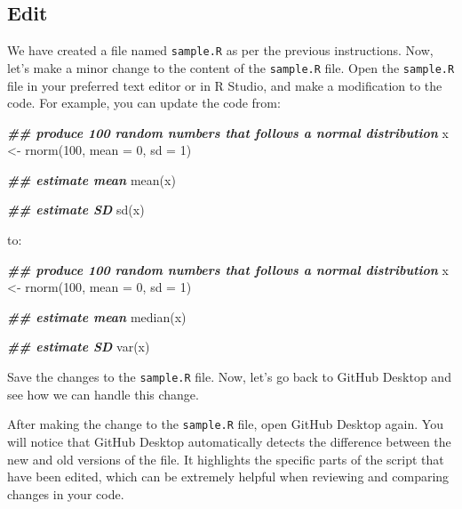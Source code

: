 \documentclass[
]{book}
\newenvironment{Shaded}{\begin{snugshade}}{\end{snugshade}}
\newcommand{\AttributeTok}[1]{\textcolor[rgb]{0.77,0.63,0.00}{#1}}
\newcommand{\DecValTok}[1]{\textcolor[rgb]{0.00,0.00,0.81}{#1}}
\newcommand{\DocumentationTok}[1]{\textcolor[rgb]{0.56,0.35,0.01}{\textbf{\textit{#1}}}}
\newcommand{\FunctionTok}[1]{\textcolor[rgb]{0.00,0.00,0.00}{#1}}
\newcommand{\NormalTok}[1]{#1}
\newcommand{\OtherTok}[1]{\textcolor[rgb]{0.56,0.35,0.01}{#1}}
\begin{document}
\hypertarget{edit}{%
\subsection{Edit}\label{edit}}

We have created a file named \texttt{sample.R} as per the previous instructions. Now, let's make a minor change to the content of the \texttt{sample.R} file. Open the \texttt{sample.R} file in your preferred text editor or in R Studio, and make a modification to the code. For example, you can update the code from:

\begin{Shaded}
\begin{Highlighting}[]
\DocumentationTok{\#\# produce 100 random numbers that follows a normal distribution}
\NormalTok{x }\OtherTok{\textless{}{-}} \FunctionTok{rnorm}\NormalTok{(}\DecValTok{100}\NormalTok{, }\AttributeTok{mean =} \DecValTok{0}\NormalTok{, }\AttributeTok{sd =} \DecValTok{1}\NormalTok{)}

\DocumentationTok{\#\# estimate mean}
\FunctionTok{mean}\NormalTok{(x)}

\DocumentationTok{\#\# estimate SD}
\FunctionTok{sd}\NormalTok{(x)}
\end{Highlighting}
\end{Shaded}

to:

\begin{Shaded}
\begin{Highlighting}[]
\DocumentationTok{\#\# produce 100 random numbers that follows a normal distribution}
\NormalTok{x }\OtherTok{\textless{}{-}} \FunctionTok{rnorm}\NormalTok{(}\DecValTok{100}\NormalTok{, }\AttributeTok{mean =} \DecValTok{0}\NormalTok{, }\AttributeTok{sd =} \DecValTok{1}\NormalTok{)}

\DocumentationTok{\#\# estimate mean}
\FunctionTok{median}\NormalTok{(x)}

\DocumentationTok{\#\# estimate SD}
\FunctionTok{var}\NormalTok{(x)}
\end{Highlighting}
\end{Shaded}

Save the changes to the \texttt{sample.R} file. Now, let's go back to GitHub Desktop and see how we can handle this change.

After making the change to the \texttt{sample.R} file, open GitHub Desktop again. You will notice that GitHub Desktop automatically detects the difference between the new and old versions of the file. It highlights the specific parts of the script that have been edited, which can be extremely helpful when reviewing and comparing changes in your code.
\end{document}
